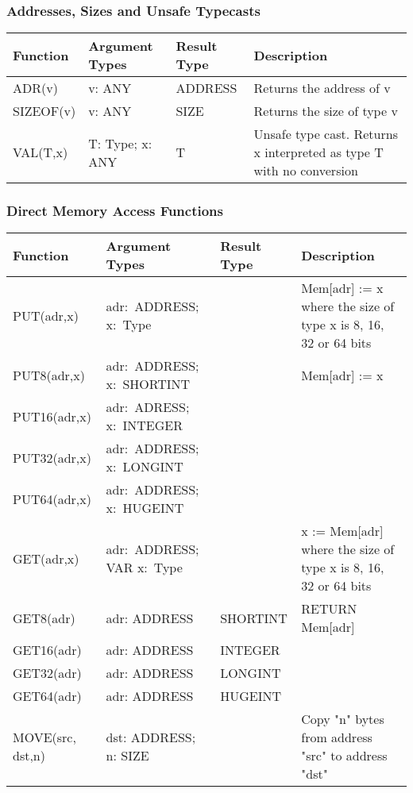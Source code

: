 \documentclass[a4paper,11pt]{article}
\begin{document}
\subsubsection{Addresses, Sizes and Unsafe Typecasts}
\begin{longtable}{|p{3cm}|p{3cm}|p{2cm}|p{6cm}|}
\hline
Function & Argument Types & Result Type & Description \\
\hline\hline
\endhead
ADR(v) & v: ANY & ADDRESS & Returns the address of v \\
\hline
SIZEOF(v) & v: ANY & SIZE & Returns the size of type v \\
\hline
VAL(T,x) & T: Type; x: ANY & T & Unsafe type cast. Returns x interpreted as type T with no conversion \\
\hline
\end{longtable}

\subsubsection{Direct Memory Access Functions}
\begin{longtable}{|p{3cm}|v{3cm}|p{2cm}|p{6cm}|}
\hline
Function & Argument Types & Result Type & Description \\
\hline\hline
\endhead
PUT(adr,x) & adr:~ADDRESS; x:~Type & & Mem[adr] := x where the size of type x is 8, 16, 32 or 64 bits \\
\hline
PUT8(adr,x) & adr:~ADDRESS; x:~SHORTINT & & Mem[adr] := x \\
PUT16(adr,x) & adr:~ADRESS; x:~INTEGER && \\
PUT32(adr,x) & adr:~ADDRESS; x:~LONGINT && \\
PUT64(adr,x) & adr:~ADDRESS; x:~HUGEINT && \\
\hline
GET(adr,x) & adr:~ADDRESS; VAR x:~Type & & x := Mem[adr] where the size of type x is 8, 16, 32 or 64 bits \\
\hline
GET8(adr) & adr: ADDRESS & SHORTINT & RETURN Mem[adr] \\
GET16(adr) & adr: ADDRESS & INTEGER &\\
GET32(adr) & adr: ADDRESS & LONGINT & \\
GET64(adr) & adr: ADDRESS & HUGEINT & \\
\hline
MOVE(src, dst,n) & dst: ADDRESS; n: SIZE & & Copy "n" bytes from address "src" to address "dst" \\
\hline \end{longtable}
\end{document}
